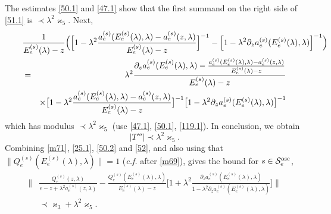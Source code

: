\documentclass[letterpaper,onecolumn,11pt,accepted=2021-12-09]{quantumarticle}
\numberwithin{equation}{section}
\newcommand{\aes}{a_e^{(s)}}
\newcommand{\Qes}{Q_e^{(s)}}
\newcommand{\Ees}{E_e^{(s)}(\lambda)}
\begin{document}
The estimates \eqref{50.1} and \eqref{47.1} show that the first summand on the right side of  \eqref{51.1} is $\prec\lambda^2 \varkappa_5$. Next,
\begin{eqnarray}
\lefteqn{
\frac{1}{\Ees-z}\Big( \Big[ 1-\lambda^2 \frac{\aes(\Ees,\lambda)-
		\aes(z,\lambda)}{\Ees-z}
	\Big]^{-1}- \Big[ 1-\lambda^2 \partial_z\aes(\Ees,\lambda)\Big]^{-1}\Big)
 }\nonumber\\
&=&\lambda^2  \frac{\partial_z\aes(\Ees,\lambda) - \frac{\aes(\Ees,\lambda)-\aes(z,\lambda)}{\Ees-z}}{\Ees-z}\nonumber\\
&&\times \big[1-\lambda^2  \frac{\aes(\Ees,\lambda)-\aes(z,\lambda)}{\Ees-z}\big]^{-1} \big[1-\lambda^2 \partial_z \aes(\Ees,\lambda)\big]^{-1}
\end{eqnarray}
which has modulus  $\prec \lambda^2 \varkappa_5$ (use \eqref{47.1}, \eqref{50.1}, \eqref{119.1}). In conclusion, we obtain 
\begin{equation}
| T''' |\prec \lambda^2 \varkappa_5.
\label{52}
\end{equation}
Combining \eqref{m71}, \eqref{25.1}, \eqref{50.2} and \eqref{52}, and also using that $\|\Qes(\Ees,\lambda)\|=1$ ({\em c.f.} after \eqref{m69}), gives the bound for $s\in{\mathcal S}_e^{\rm osc}$, 
\begin{align}
\Big\| & \frac{\Qes(z,\lambda)}{e-z+\lambda^2 \aes(z,\lambda)} -  \frac{\Qes(\Ees,\lambda)}{\Ees-z} \Big[ 1+\lambda^2  \frac{\partial_z\aes(\Ees,\lambda)}{1-\lambda^2\partial_z
	\aes(\Ees,\lambda)} \Big]\Big\| \nonumber\\
&\prec \varkappa_3+\lambda^2\varkappa_5.
\label{35}
\end{align}
\end{document}
